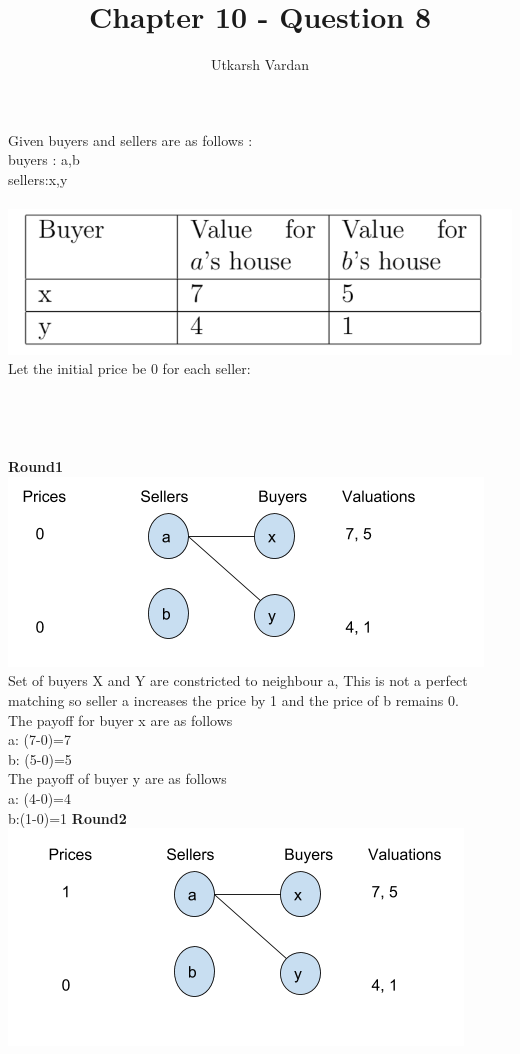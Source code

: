\documentclass[]{article}
\title{Chapter 10 - Question 8}
\author{Utkarsh Vardan}
\date{}
\begin{document}
\maketitle
Given buyers and sellers are as follows :\\
buyers : {a,b}\\
sellers:{x,y}\\\\
\includegraphics[scale=.5]{8q.png}\\
Let the initial price be 0 for each seller:\\\\\\\\\\
\textbf{Round1} 
\includegraphics[scale=.5]{8r1.png}\\
Set of buyers X and Y are constricted to neighbour a,  This is not a perfect matching so seller a increases the price by 1 and the price of b remains 0.\\
The payoff for buyer x are as follows \\
a: (7-0)=7\\
b: (5-0)=5\\
The payoff of buyer y are as follows\\
a: (4-0)=4\\
b:(1-0)=1
\newpage
\textbf{Round2} \\
\includegraphics[scale=.5]{8r2.png}\\
\end{document}
